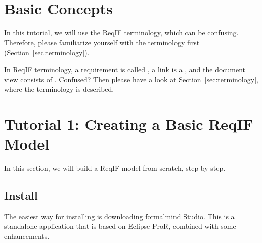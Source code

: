 % 

\section{Basic Concepts}

In this tutorial, we will use the ReqIF terminology, which can be confusing.  Therefore, please familiarize yourself with the terminology first (Section~\ref{sec:terminology}).

\begin{warning}
In ReqIF terminology, a requirement is called , a link is a , and the document view consists of .  Confused? Then please have a look at Section~\ref{sec:terminology}, where the terminology is described.
\end{warning}

\section{Tutorial 1: Creating a Basic ReqIF Model}

In this section, we will build a ReqIF model from scratch, step by step.

\subsection{Install \pror{}}

The easiest way for installing \pror{} is downloading \href{http://formalmind.com/studio}{formalmind Stu\-dio}.  This is a standalone-application that is based on Eclipse ProR, combined with some enhancements.

